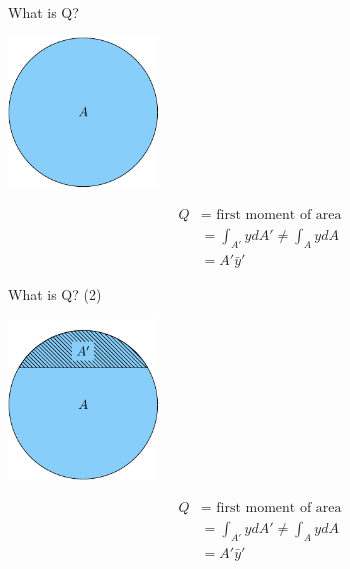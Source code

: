 \documentclass[10pt, svgnames]{beamer}
\begin{document}
\begin{frame}[label={sec:org7841ac5}]{What is Q?}
\begin{center}
\includegraphics[width=0.3\textwidth]{pictures/first-moment.pdf}
\end{center}

\begin{align*}
    Q &= \text{ first moment of area} \\
      &= \int_{A'} ydA' \neq \int_A ydA \\
      &= A'\bar{y}'
\end{align*}
\end{frame}

\begin{frame}[label={sec:orgfde455d}]{What is Q? (2)}
\begin{center}
\includegraphics[width=0.3\textwidth]{pictures/first-moment-2.pdf}
\end{center}

\begin{align*}
    Q &= \text{ first moment of area} \\
      &= \int_{A'} ydA' \neq \int_A ydA \\
      &= A'\bar{y}'
\end{align*}
\end{frame}
\end{document}
